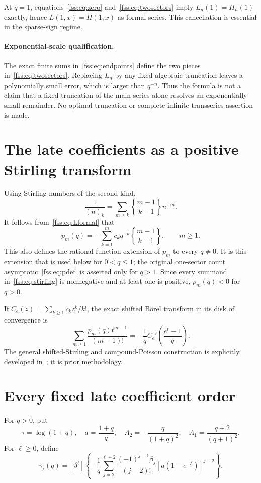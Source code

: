 \documentclass[11pt]{article}
\newcommand{\fall}[2]{(#1)_{#2}}
\newcommand{\Stir}[2]{\genfrac\{\}{0pt}{}{#1}{#2}}
\begin{document}
At $q=1$, equations~\eqref{fss:eq:zero} and~\eqref{fss:eq:twosectors} imply $L_n(1)=H_n(1)$ exactly, hence $L(1,x)=H(1,x)$ as formal series. This cancellation is essential in the sparse-sign regime.

\paragraph{Exponential-scale qualification.}
The exact finite sums in~\eqref{fss:eq:endpoints} define the two pieces in~\eqref{fss:eq:twosectors}. Replacing $L_n$ by any fixed algebraic truncation leaves a polynomially small error, which is larger than $q^{-n}$. Thus the formula is not a claim that a fixed truncation of the main series alone resolves an exponentially small remainder. No optimal-truncation or complete infinite-transseries assertion is made.

\section{The late coefficients as a positive Stirling transform}\label{fss:sec:stirling}
Using Stirling numbers of the second kind,
\[
 \frac1{\fall nk}=\sum_{m\ge k}\Stir{m-1}{k-1}n^{-m}.
\]
It follows from~\eqref{fss:eq:Lformal} that
\begin{equation}\label{fss:eq:stirling}
 p_m(q)=-\sum_{k=1}^m c_kq^{-k}\Stir{m-1}{k-1},\qquad m\ge1.
\end{equation}
This also defines the rational-function extension of $p_m$ to every $q\ne0$. It is this extension that is used below for $0<q\le1$; the original one-sector count asymptotic~\eqref{fss:eq:pdef} is asserted only for $q>1$. Since every summand in~\eqref{fss:eq:stirling} is nonnegative and at least one is positive, $p_m(q)<0$ for $q>0$.

If $C_e(z)=\sum_{k\ge1}c_kz^k/k!$, the exact shifted Borel transform in its disk of convergence is
\begin{equation}\label{fss:eq:borel}
 \sum_{m\ge1}\frac{p_m(q)t^{m-1}}{(m-1)!}
 =-\frac1q C_e'\!\left(\frac{e^t-1}{q}\right).
\end{equation}
The general shifted-Stirling and compound-Poisson construction is explicitly developed in~\cite{MK}; it is prior methodology.

\section{Every fixed late coefficient order}\label{fss:sec:late}
For $q>0$, put
\[
 \tau=\log(1+q),\quad a=\frac{1+q}{q},\quad
 A_2=-\frac{q}{(1+q)^2},\quad A_1=\frac{q+2}{(q+1)^2}.
\]
For $\ell\ge0$, define
\begin{equation}\label{fss:eq:gamma}
 \gamma_\ell(q)=[\delta^\ell]\left\{-\frac1q
 \sum_{j=2}^{\ell+2}\frac{(-1)^{j-1}\beta_j}{(j-2)!}
 \left[a(1-e^{-\delta})\right]^{j-2}\right\}.
\end{equation}
\end{document}
